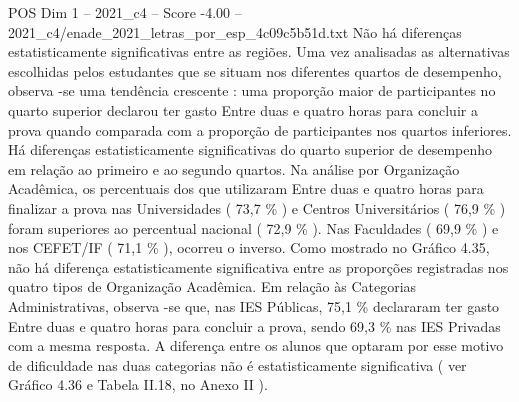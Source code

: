 \begin{textsample}{POS Dim 1 – 2021\_c4 – Score -4.00 – 2021\_c4/enade\_2021\_letras\_por\_esp\_4c09c5b51d.txt}
Não há diferenças estatisticamente significativas entre as regiões.
Uma vez analisadas as alternativas escolhidas pelos estudantes que se situam nos diferentes quartos de desempenho, observa -se uma tendência crescente : uma proporção maior de participantes no quarto superior declarou ter gasto Entre duas e quatro horas para concluir a prova quando comparada com a proporção de participantes nos quartos inferiores.
Há diferenças estatisticamente significativas do quarto superior de desempenho em relação ao primeiro e ao segundo quartos.
Na análise por Organização Acadêmica, os percentuais dos que utilizaram Entre duas e quatro horas para finalizar a prova nas Universidades ( 73,7 \% ) e Centros Universitários ( 76,9 \% ) foram superiores ao percentual nacional ( 72,9 \% ).
Nas Faculdades ( 69,9 \% ) e nos CEFET/IF ( 71,1 \% ), ocorreu o inverso.
Como mostrado no Gráfico 4.35, não há diferença estatisticamente significativa entre as proporções registradas nos quatro tipos de Organização Acadêmica.
Em relação às Categorias Administrativas, observa -se que, nas IES Públicas, 75,1 \% declararam ter gasto Entre duas e quatro horas para concluir a prova, sendo 69,3 \% nas IES Privadas com a mesma resposta.
A diferença entre os alunos que optaram por esse motivo de dificuldade nas duas categorias não é estatisticamente significativa ( ver Gráfico 4.36 e Tabela II.18, no Anexo II ).

\end{textsample}
